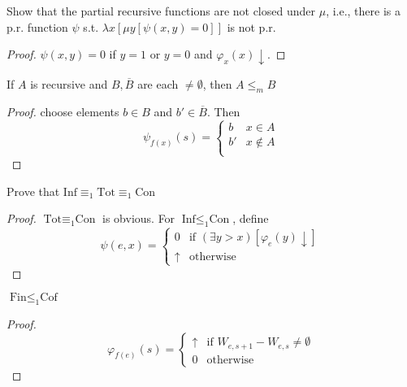 \documentclass[11pt]{article}
\begin{document}
\begin{exercise}
Show that the partial recursive functions are not closed under \(\mu\), i.e.,
there is a p.r. function \(\psi\) s.t. \(\lambda x[\mu y[\psi(x,y)=0]]\) is not p.r.
\end{exercise}
\begin{proof}
\(\psi(x,y)=0\) if \(y=1\) or \(y=0\) and \(\varphi_x(x)\downarrow\).
\end{proof}
\begin{exercise}
If \(A\) is recursive and \(B,\overline{B}\) are each \(\neq\emptyset\), then
\(A\le_m B\)
\end{exercise}
\begin{proof}
choose elements \(b\in B\) and \(b'\in\overline{B}\). Then
\begin{equation*}
\psi_{f(x)}(s)=
\begin{cases}
b&x\in A\\
b'&x\not\in A\\
\end{cases}
\end{equation*}
\end{proof}
\begin{exercise}
Prove that \(\text{Inf}\equiv_1\text{Tot}\equiv_1\text{Con}\)
\end{exercise}
\begin{proof}
\(\text{Tot}\equiv_1\text{Con}\) is obvious. For \(\text{Inf}\le_1\text{Con}\),
define
\begin{equation*}
\psi(e,x)=
\begin{cases}
0&\text{if }(\exists y>x)[\varphi_e(y)\downarrow]\\
\uparrow&\text{otherwise}
\end{cases}
\end{equation*}
\end{proof}

\begin{exercise}
\(\text{Fin}\le_1\text{Cof}\)
\end{exercise}
\begin{proof}
\begin{equation*}
\varphi_{f(e)}(s)=
\begin{cases}
\uparrow&\text{if } W_{e,s+1}-W_{e,s}\neq\emptyset\\
0&\text{otherwise}
\end{cases}
\end{equation*}
\end{proof}
\end{document}

